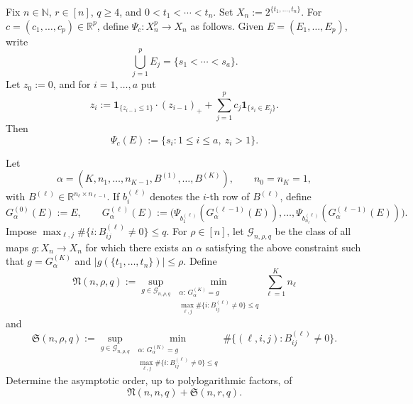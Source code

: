 Fix \(n\in\mathbb{N}\), \(r\in[n]\), \(q\ge 4\), and
    \(0<t_1<\cdots<t_n\). Set
    \(
    X_n:=2^{\{t_1,\dots,t_n\}}.
    \)
    For \(c=(c_1,\dots,c_p)\in\mathbb{R}^p\), define
    \(\Psi_c:X_n^p\to X_n\) as follows. Given
    \(E=(E_1,\dots,E_p)\), write
    \[
    \bigcup_{j=1}^p E_j=\{s_1<\cdots<s_a\}.
    \]
    Let \(z_0:=0\), and for \(i=1,\dots,a\) put
    \[
    z_i
    :=
    \mathbf{1}_{\{z_{i-1}\le 1\}} \cdot (z_{i-1})_+
    +
    \sum_{j=1}^p c_j\mathbf{1}_{\{s_i\in E_j\}} .
    \]
    Then
    \[
    \Psi_c(E):=\{s_i:1\le i\le a,\ z_i>1\}.
    \]
    
    Let
    \[
    \alpha=(K,n_1,\dots,n_{K-1},B^{(1)},\dots,B^{(K)}),
    \qquad
    n_0=n_K=1,
    \]
    with \(B^{(\ell)}\in\mathbb{R}^{n_\ell\times n_{\ell-1}}\). If
    \(b_i^{(\ell)}\) denotes the \(i\)-th row of \(B^{(\ell)}\), define
    \[
    G_\alpha^{(0)}(E):=E,
    \qquad
    G_\alpha^{(\ell)}(E)
    :=
    \bigl(
    \Psi_{b_1^{(\ell)}}(G_\alpha^{(\ell-1)}(E)),
    \dots,
    \Psi_{b_{n_\ell}^{(\ell)}}(G_\alpha^{(\ell-1)}(E))
    \bigr).
    \]
    Impose
    \(
    \max_{\ell,j}\#\{i:B_{ij}^{(\ell)}\neq 0\}\le q .
    \)
    For \(\rho\in[n]\), let \(\mathcal G_{n,\rho,q}\) be the class of all maps
    \(g:X_n\to X_n\) for which there exists an \(\alpha\) satisfying the above constraint such that $g=G_\alpha^{(K)}$ and $|g(\{t_1,\dots,t_n\})|\le \rho$. Define
    \[
    \mathfrak{N}(n,\rho,q)
    :=
    \sup_{g\in\mathcal G_{n,\rho,q}}
    \min_{\substack{\alpha:\,G_\alpha^{(K)}=g\\
    \max_{\ell,j}\#\{i:B_{ij}^{(\ell)}\neq 0\}\le q}}
    \sum_{\ell=1}^K n_\ell
    \]
    and
    \[
    \mathfrak{S}(n,\rho,q)
    :=
    \sup_{g\in\mathcal G_{n,\rho,q}}
    \min_{\substack{\alpha:\,G_\alpha^{(K)}=g\\
    \max_{\ell,j}\#\{i:B_{ij}^{(\ell)}\neq 0\}\le q}}
    \#\{(\ell,i,j):B_{ij}^{(\ell)}\neq 0\}.
    \]
    Determine the asymptotic order, up to polylogarithmic factors, of
    \[
        \mathfrak{N}(n,n,q)+\mathfrak{S}(n,r,q).
    \]
